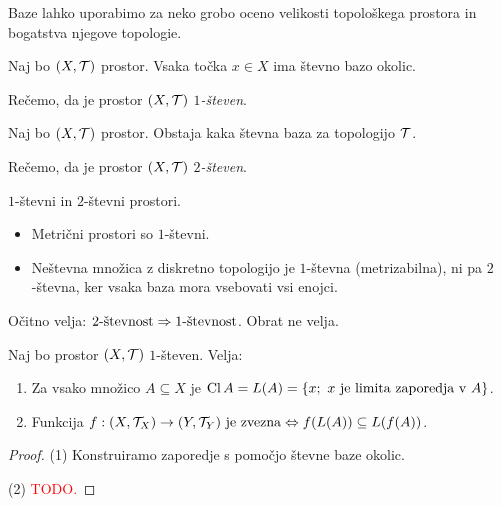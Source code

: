 Baze lahko uporabimo za neko grobo oceno velikosti topološkega prostora in bogatstva njegove topologie.

\begin{aksiom}
    Naj bo $(X, \mathcal{T})$ prostor. Vsaka točka $x \in X$ ima števno bazo okolic.

    Rečemo, da je prostor $(X, \mathcal{T})$ \emph{$1$-števen}. 
\end{aksiom}

\begin{aksiom}
    Naj bo $(X, \mathcal{T})$ prostor. Obstaja kaka števna baza za topologijo $\mathcal{T}$.

    Rečemo, da je prostor $(X, \mathcal{T})$ \emph{$2$-števen}. 
\end{aksiom}

\begin{primer}
    $1$-števni in $2$-števni prostori. 
    \begin{itemize}
        \item Metrični prostori so $1$-števni. 
        \item Neštevna množica z diskretno topologijo je $1$-števna (metrizabilna), ni pa $2$-števna, ker vsaka baza mora vsebovati vsi enojci.
    \end{itemize}
\end{primer}

\begin{trditev}
    Očitno velja: $2\text{-števnost} \Rightarrow 1\text{-števnost}$. Obrat ne velja. 
\end{trditev}

\begin{trditev}
    Naj bo prostor $(X, \mathcal{T})$ $1$-števen. Velja:
    \begin{enumerate}
        \item Za vsako množico $A \subseteq X$ je $\operatorname{Cl} A = L(A) = \left\{x; \ x \text{ je limita zaporedja v } A\right\}$.
        \item Funkcija $f: (X, \mathcal{T}_X) \to (Y, \mathcal{T}_Y) \text{ je zvezna} \Leftrightarrow f(L(A)) \subseteq L(f(A))$.
    \end{enumerate}
\end{trditev}

\begin{proof}
    (1) Konstruiramo zaporedje s pomočjo števne baze okolic.

    (2) \textcolor{red}{TODO.}
\end{proof}
